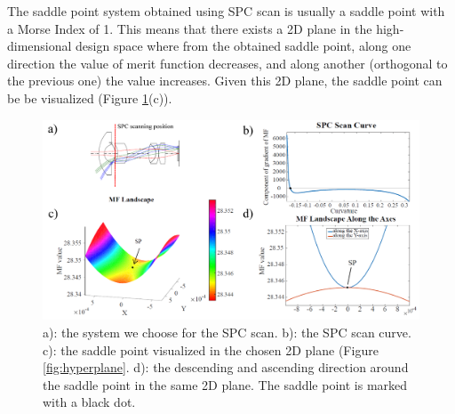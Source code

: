 The saddle point system obtained using SPC scan is usually a saddle point with a Morse Index of 1. This means that there exists a 2D plane in the high-dimensional design space where from the obtained saddle point, along one direction the value of merit function decreases, and along another (orthogonal to the previous one) the value increases. Given this 2D plane, the saddle point can be be visualized (Figure \ref{fig:WAL_demo_sp}(c)). 
\begin{figure}[h!]
    \centering
    \includegraphics[width=\textwidth]{chapter-4/figures/WAL_demo_sp.png}
    \caption{a): the system we choose for the SPC scan. b): the SPC scan curve. c): the saddle point visualized in the chosen 2D plane (Figure \ref{fig:hyperplane}. d): the descending and ascending direction around the saddle point in the same 2D plane. The saddle point is marked with a black dot.}
    \label{fig:WAL_demo_sp}
\end{figure}

